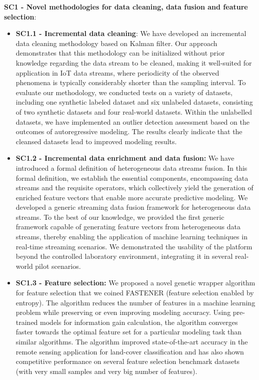 \noindent \noindent \textbf{SC1 - Novel methodologies for data cleaning, data fusion and feature selection}: 
\begin{itemize}
    \item \textbf{SC1.1 - Incremental data cleaning}: 
        We have developed an incremental data cleaning methodology based on Kalman filter.
        Our approach demonstrates that this methodology can be initialized without prior knowledge regarding the data stream to be cleaned, making it well-suited for application in IoT data streams, where periodicity of the observed phenomena is typically considerably shorter than the sampling interval.
        To evaluate our methodology, we conducted tests on a variety of datasets, including one synthetic labeled dataset and six unlabeled datasets, consisting of two synthetic datasets and four real-world datasets.
        Within the unlabelled datasets, we have implemented an outlier detection assessment based on the outcomes of autoregressive modeling. The results clearly indicate that the cleansed datasets lead to improved modeling results.
    \item \textbf{SC1.2 - Incremental data enrichment and data fusion:} 
        We have introduced a formal definition of heterogeneous data streams fusion. 
        In this formal definition, we establish the essential components, encompassing data streams and the requisite operators, which collectively yield the generation of enriched feature vectors that enable more accurate predictive modeling.
        We developed a generic streaming data fusion framework for heterogeneous data streams. 
        To the best of our knowledge, we provided the first generic framework capable of generating feature vectors from heterogeneous data streams, thereby enabling the application of machine learning techniques in real-time streaming scenarios.
        We demonstrated the usability of the platform beyond the controlled laboratory environment, integrating it in several real-world pilot scenarios.        
    \item \textbf{SC1.3 - Feature selection:}
        We proposed a novel genetic wrapper algorithm for feature selection that we coined FASTENER (feature selection enabled by entropy).
        The algorithm reduces the number of features in a machine learning problem while preserving or even improving modeling accuracy.
        Using pre-trained models for information gain calculation, the algorithm converges faster towards the optimal feature set for a particular modeling task than similar algorithms.
        The algorithm improved state-of-the-art accuracy in the remote sensing application for land-cover classification and has also shown competitive performance on several feature selection benchmark datasets (with very small samples and very big number of features).        
\end{itemize}

